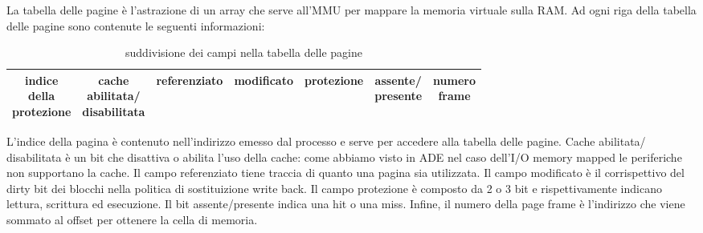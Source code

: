 \documentclass{article}
\begin{document}
La tabella delle pagine è l'astrazione di un array che serve all'MMU per mappare la memoria virtuale sulla RAM. Ad ogni riga della tabella delle pagine sono contenute le seguenti informazioni:
\begin{table}[ht]
	\label{tabella_pagine}
	\centering
	\begin{tabular}{|c|c|c|c|c|c|c|}
		\hline
		\makecell{indice\\della\\protezione}  & \makecell{cache\\abilitata/\\disabilitata} & referenziato & modificato & protezione & \makecell{assente/\\presente} & \makecell{numero\\frame} \\
		\hline 
	\end{tabular}
	\caption{suddivisione dei campi nella tabella delle pagine}
\end{table}

L'indice della pagina è contenuto nell'indirizzo emesso dal processo e serve per accedere alla tabella delle pagine. Cache abilitata/ disabilitata è un bit che disattiva o abilita l'uso della cache: come abbiamo visto in ADE nel caso dell'I/O memory mapped le periferiche non supportano la cache. Il campo referenziato tiene traccia di quanto una pagina sia utilizzata. Il campo modificato è il corrispettivo del dirty bit dei blocchi nella politica di sostituizione write back. Il campo protezione è composto da 2 o 3 bit e rispettivamente indicano lettura, scrittura ed esecuzione. Il bit assente/presente indica una hit o una miss. Infine, il numero della page frame è l'indirizzo che viene sommato al offset per ottenere la cella di memoria.\\
\end{document}

